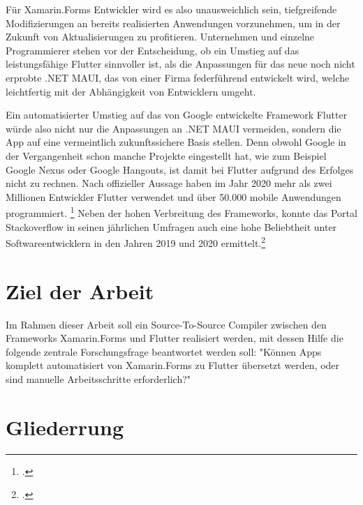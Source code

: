 Für Xamarin.Forms Entwickler wird es also unausweichlich sein,  tiefgreifende Modifizierungen an bereits realisierten Anwendungen vorzunehmen,  um in der Zukunft von Aktualisierungen zu profitieren.  Unternehmen und einzelne Programmierer stehen vor der Entscheidung,  ob ein Umstieg auf das leistungsfähige Flutter sinnvoller ist,  als die Anpassungen für das neue noch nicht erprobte .NET MAUI, das von einer Firma federführend entwickelt wird,  welche leichtfertig mit der Abhängigkeit von Entwicklern umgeht.

Ein automatisierter Umstieg auf das von Google entwickelte Framework Flutter würde also nicht nur die Anpassungen an .NET MAUI vermeiden,  sondern die App auf eine vermeintlich zukunftssichere Basis stellen.  Denn obwohl Google in der Vergangenheit schon manche Projekte eingestellt hat,  wie zum Beispiel Google Nexus oder Google Hangouts, ist damit bei Flutter aufgrund des Erfolges nicht zu rechnen.  Nach offizieller Aussage haben im Jahr 2020 mehr als zwei Millionen Entwickler Flutter verwendet und über 50.000 mobile Anwendungen programmiert. \footcite[Vgl.][Abgerufen am 28.10.2020]{Hunter2020} Neben der hohen Verbreitung des Frameworks,  konnte das Portal Stackoverflow in seinen jährlichen Umfragen auch eine hohe Beliebtheit unter Softwareentwicklern in den Jahren 2019 und 2020 ermittelt.\footcite[Vgl.][Abgerufen am 28.10.2020]{Hunter2020}


\section{Ziel der Arbeit}
Im Rahmen dieser Arbeit soll ein Source-To-Source Compiler zwischen den Frameworks Xamarin.Forms und Flutter realisiert werden, mit dessen Hilfe die folgende zentrale Forschungsfrage beantwortet werden soll: "Können Apps komplett automatisiert von Xamarin.Forms zu Flutter übersetzt werden, oder sind manuelle Arbeitsschritte erforderlich?"


\section{Gliederrung}
